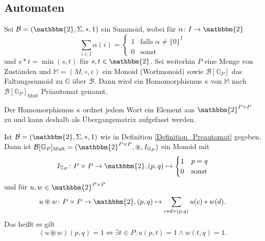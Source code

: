 \documentclass{article}
\begin{document}
\subsection{Automaten}

\begin{definition}\label{Definition_Preautomat}
  Sei $\mathcal{B} = (\mathbbm{2}, \Sigma, \ast, 1)$ ein Summoid,
  wobei für $\alpha \colon I \to \mathbbm{2}$
  \begin{equation*}
    \sum_{i \in I}\alpha(i) = 
    \begin{cases}
      1 & \text{falls } \alpha \neq \{0\}^I \\
      0 & \text{sonst}
    \end{cases}
  \end{equation*}
  und $s \ast t = \min(s, t)$ für $s, t \in \mathbbm{2}$.
  Sei weiterhin $P$ eine Menge von Zuständen 
  und $\mathbb{M} = (M, \circ, \varepsilon)$ ein Monoid (Wortmonoid)
  sowie $\mathcal{B}[\mathbb{G}_P]$ das Faltungssumoid zu $\mathbb{G}$ über $\mathcal{B}$.
  Dann wird ein Homomorphismus $\kappa$ von $\mathbb{M}$ nach $\mathcal{B}[\mathbb{G}_P]_\text{Mult}$ Präautomat genannt.

  Der Homomorphismus $\kappa$ ordnet jedem Wort ein Element aus $\mathbbm{2}^{P \times P}$ zu
  und kann deshalb als Übergangsmatrix aufgefasst werden.
\end{definition}

\begin{remark}
  Ist $\mathcal{B} = (\mathbbm{2}, \Sigma, \ast, 1)$ wie in Definition \ref{Definition_Preautomat} gegeben.
  Dann ist $\mathcal{B}[\mathbb{G}_P]_\text{Mult} = (\mathbbm{2}^{P \times P}, \circledast, I_{\mathbb{G}_P})$
  ein Monoid mit
  \begin{equation*}
    I_{\mathbb{G}_P} \colon P \times P \to \mathbbm{2}, (p, q) \mapsto
    \begin{cases}
      1 & p = q \\
      0 & \text{sonst}
    \end{cases}
  \end{equation*}
  und für $u, w \in \mathbbm{2}^{P \times P}$
  \begin{equation*}
    u \circledast w \colon P \times P \to \mathbbm{2}, (p, q) \mapsto
    \sum_{c \star d = (p, q)} u(c) \ast w(d).
  \end{equation*}
  Das heißt es gilt
  \begin{equation*}
    (u \circledast w)(p, q) = 1 \iff \exists t \in P \colon u(p, t) = 1 \wedge w(t, q) = 1.
  \end{equation*}
\end{remark}
\end{document}
